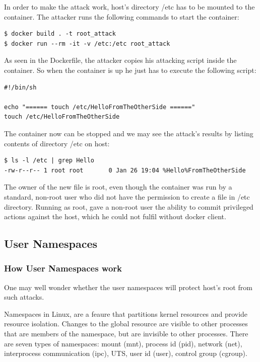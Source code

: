 In order to make the attack work, host's directory /etc has to be mounted to the container. The attacker runs the following commands to start the container:

\begin{lstlisting}[style=terminal]
$ docker build . -t root_attack
$ docker run --rm -it -v /etc:/etc root_attack
\end{lstlisting}

As seen in the Dockerfile, the attacker copies his attacking script inside the container. So when the container is up he just has to execute the following script:

\begin{lstlisting}[style=shellscript, caption={3\_attack.sh}]
#!/bin/sh

echo "====== touch /etc/HelloFromTheOtherSide ======"
touch /etc/HelloFromTheOtherSide
\end{lstlisting}

The container now can be stopped and we may see the attack's results by listing contents of directory /etc on host:

\begin{lstlisting}[style=terminal]
$ ls -l /etc | grep Hello
-rw-r--r-- 1 root root       0 Jan 26 19:04 %Hello%FromTheOtherSide
\end{lstlisting}

The owner of the new file is root, even though the container was run by a standard, non-root user who did not have the permission to create a file in /etc directory.
Running as root, gave a non-root user the ability to commit privileged actions against the host, which he could not fulfil without docker client. 

\subsection{User Namespaces} \label{userns}
\subsubsection{How User Namespaces work}
One may well wonder whether the user namespaces will protect host's root from such attacks.

Namespaces in Linux, are a feaure that partitions kernel resources and provide resource isolation. Changes to the global resource are visible to other processes that are members of the namespace, but are invisible to other processes. There are seven types of namespaces: mount (mnt), process id (pid), network (net), interprocess communication (ipc), UTS, user id (user), control group (cgroup).

